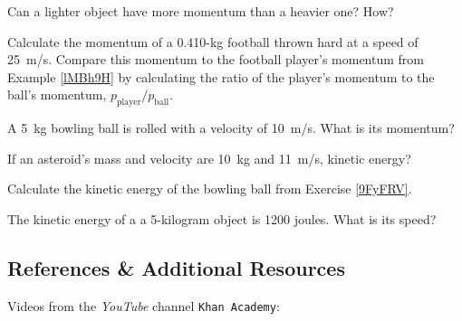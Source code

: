\documentclass[../main.tex]{subfiles}
\begin{document}

\begin{exercise}
    Can a lighter object have more momentum than a heavier one? How?
\end{exercise}


\begin{exercise} \label{QDJrfn}
    Calculate the momentum of a 0.410-kg football thrown hard at a speed of \SI{25}{m/s}. Compare this momentum to the football player's momentum from Example \ref{lMBh9H} by calculating the ratio of the player's momentum to the ball's momentum, $p_{\text{player}}/p_{\text{ball}}$.
\end{exercise}

\begin{exercise} \label{9FyFRV}
    A \SI{5}{kg} bowling ball is rolled with a velocity of \SI{10}{m/s}. What is its momentum?
\end{exercise}


\begin{exercise} \label{5CHfrd}
    If an asteroid's mass and velocity are \SI{10}{kg} and \SI{11}{m/s}, kinetic energy?
\end{exercise}

\begin{exercise} \label{s9xduj}
    Calculate the kinetic energy of the bowling ball from Exercise \ref{9FyFRV}.
\end{exercise}

\begin{exercise} \label{pVdq3i}
    The kinetic energy of a a 5-kilogram object is 1200 joules. What is its speed?
\end{exercise}


\clearpage
\printnoidxglossaries

\clearpage

\subsection{References \& Additional Resources}

Videos from the \textit{YouTube} channel \texttt{Khan Academy}:
\vspace{-1ex}
\end{document}
